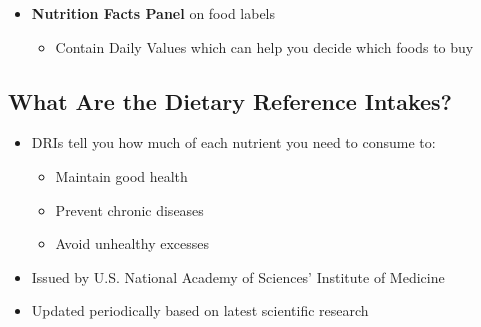 \documentclass[12pt]{article}
\begin{document}
\begin{itemize}
\begin{enumerate}
\begin{itemize}
                            \end{itemize}
                    \end{enumerate}
                    \begin{itemize}
                        \item \textbf{Nutrition Facts Panel} on food labels
                            \begin{itemize}
                                \item Contain Daily Values which can help you decide which foods to buy
                            \end{itemize}
                    \end{itemize}
            \end{itemize}
        
        \subsection{What Are the Dietary Reference Intakes?}
            \begin{itemize}
                \item DRIs tell you how much of each nutrient you need to consume to:
                    \begin{itemize}
                        \item Maintain good health
                        \item Prevent chronic diseases
                        \item Avoid unhealthy excesses
                    \end{itemize}
                \item Issued by U.S. National Academy of Sciences' Institute of Medicine
                \item Updated periodically based on latest scientific research
            \end{itemize}
        
\end{document}
